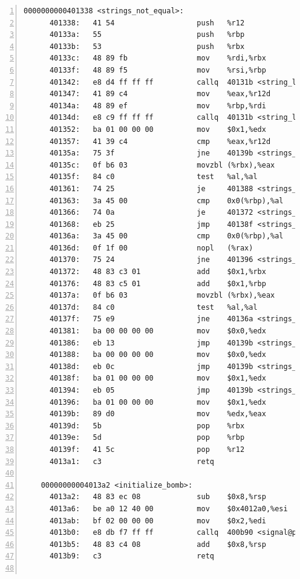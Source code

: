 \documentclass{article}
\begin{document}
\begin{lstlisting}[title = bomb的反汇编代码及部分注释, xleftmargin = 2em,xrightmargin = 2em, aboveskip = 1em, numbers = left, basicstyle=\scriptsize\ttfamily, numberstyle=\scriptsize]
    0000000000401338 <strings_not_equal>:
      401338:	41 54                	push   %r12
      40133a:	55                   	push   %rbp
      40133b:	53                   	push   %rbx
      40133c:	48 89 fb             	mov    %rdi,%rbx
      40133f:	48 89 f5             	mov    %rsi,%rbp
      401342:	e8 d4 ff ff ff       	callq  40131b <string_length>
      401347:	41 89 c4             	mov    %eax,%r12d
      40134a:	48 89 ef             	mov    %rbp,%rdi
      40134d:	e8 c9 ff ff ff       	callq  40131b <string_length>
      401352:	ba 01 00 00 00       	mov    $0x1,%edx
      401357:	41 39 c4             	cmp    %eax,%r12d
      40135a:	75 3f                	jne    40139b <strings_not_equal+0x63>
      40135c:	0f b6 03             	movzbl (%rbx),%eax
      40135f:	84 c0                	test   %al,%al
      401361:	74 25                	je     401388 <strings_not_equal+0x50>
      401363:	3a 45 00             	cmp    0x0(%rbp),%al
      401366:	74 0a                	je     401372 <strings_not_equal+0x3a>
      401368:	eb 25                	jmp    40138f <strings_not_equal+0x57>
      40136a:	3a 45 00             	cmp    0x0(%rbp),%al
      40136d:	0f 1f 00             	nopl   (%rax)
      401370:	75 24                	jne    401396 <strings_not_equal+0x5e>
      401372:	48 83 c3 01          	add    $0x1,%rbx
      401376:	48 83 c5 01          	add    $0x1,%rbp
      40137a:	0f b6 03             	movzbl (%rbx),%eax
      40137d:	84 c0                	test   %al,%al
      40137f:	75 e9                	jne    40136a <strings_not_equal+0x32>
      401381:	ba 00 00 00 00       	mov    $0x0,%edx
      401386:	eb 13                	jmp    40139b <strings_not_equal+0x63>
      401388:	ba 00 00 00 00       	mov    $0x0,%edx
      40138d:	eb 0c                	jmp    40139b <strings_not_equal+0x63>
      40138f:	ba 01 00 00 00       	mov    $0x1,%edx
      401394:	eb 05                	jmp    40139b <strings_not_equal+0x63>
      401396:	ba 01 00 00 00       	mov    $0x1,%edx
      40139b:	89 d0                	mov    %edx,%eax
      40139d:	5b                   	pop    %rbx
      40139e:	5d                   	pop    %rbp
      40139f:	41 5c                	pop    %r12
      4013a1:	c3                   	retq   
    
    00000000004013a2 <initialize_bomb>:
      4013a2:	48 83 ec 08          	sub    $0x8,%rsp
      4013a6:	be a0 12 40 00       	mov    $0x4012a0,%esi
      4013ab:	bf 02 00 00 00       	mov    $0x2,%edi
      4013b0:	e8 db f7 ff ff       	callq  400b90 <signal@plt>
      4013b5:	48 83 c4 08          	add    $0x8,%rsp
      4013b9:	c3                   	retq   
    

\end{lstlisting}
\end{document}
